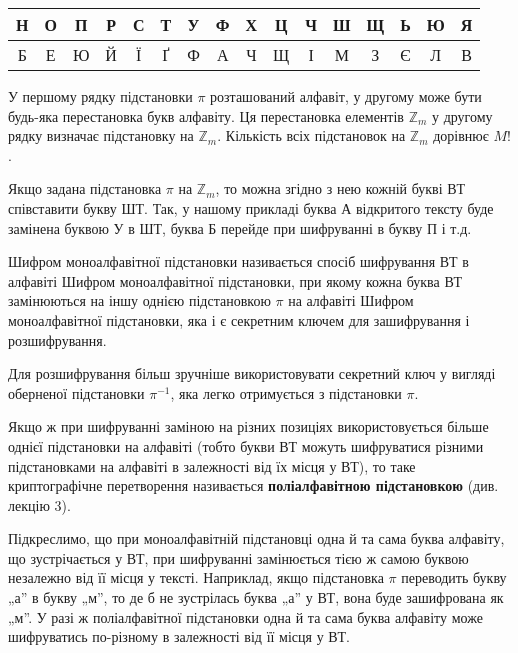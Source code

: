 \begin{table}
\centering
\begin{tabular}{|c|c|c|c|c|c|c|c|c|c|c|c|c|c|c|c|}
    \hline Н & О & П & Р & С & Т & У & Ф & Х & Ц & Ч & Ш & Щ & Ь & Ю & Я  \\
    \hline Б & Е & Ю & Й & Ї & Ґ & Ф & А & Ч & Щ & І & М & З & Є & Л & В  \\
    \hline
\end{tabular}
\end{table}


У першому рядку підстановки $\pi$ розташований алфавіт, у другому може
бути будь-яка перестановка букв алфавіту. Ця перестановка елементів $\mathbb{Z}_m$ у
другому рядку визначає підстановку на $\mathbb{Z}_m$. Кількість всіх підстановок на
$\mathbb{Z}_m$ дорівнює $M!$.

Якщо задана підстановка $\pi$ на $\mathbb{Z}_m$, то можна згідно з нею кожній букві
ВТ співставити букву ШТ. Так, у нашому прикладі буква А відкритого тексту
буде замінена буквою У в ШТ, буква Б перейде при шифруванні в букву П і
т.д.

\begin{definition}
    Шифром моноалфавітної підстановки називається
    спосіб шифрування ВТ в алфавіті Шифром моноалфавітної підстановки, при якому кожна буква ВТ замінюються
    на іншу однією підстановкою $\pi$ на алфавіті Шифром моноалфавітної підстановки, яка і є секретним ключем для
    зашифрування і розшифрування.
\end{definition}

Для розшифрування більш зручніше використовувати секретний ключ у
вигляді оберненої підстановки $\pi^{-1}$, яка легко отримується
з підстановки $\pi$.

Якщо ж при шифруванні заміною на різних позиціях використовується
більше однієї підстановки на алфавіті (тобто букви ВТ можуть шифруватися
різними підстановками на алфавіті в залежності від їх місця у ВТ), то таке
криптографічне перетворення називається \textbf{поліалфавітною підстановкою}
(див. лекцію 3).

Підкреслимо, що при моноалфавітній підстановці одна й та сама буква
алфавіту, що зустрічається у ВТ, при шифруванні замінюється тією ж самою
буквою незалежно від її місця у тексті. Наприклад, якщо підстановка $\pi$
переводить букву „а” в букву „м”, то де б не зустрілась буква „а” у ВТ, вона
буде зашифрована як „м”. У разі ж поліалфавітної підстановки одна й та сама
буква алфавіту може шифруватись по-різному в залежності від її місця у ВТ.

